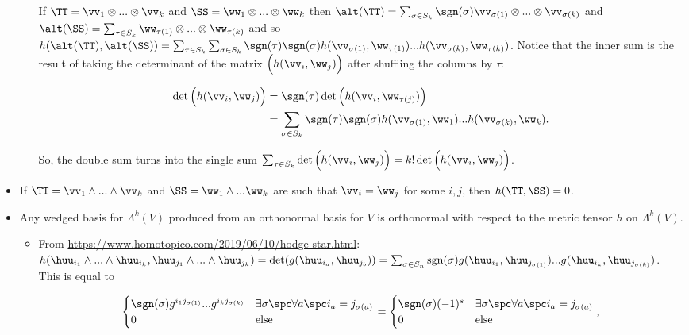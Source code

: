 \begin{itemize}
\begin{itemize}
		If $\TT = \vv_1 \otimes ... \otimes \vv_k$ and $\SS = \ww_1 \otimes ... \otimes \ww_k$ then $\alt(\TT) = \sum_{\sigma \in S_k} \sgn(\sigma) \vv_{\sigma(1)} \otimes ... \otimes \vv_{\sigma(k)}$ and $\alt(\SS) = \sum_{\tau \in S_k} \ww_{\tau(1)} \otimes ... \otimes \ww_{\tau(k)}$ and so $h(\alt(\TT), \alt(\SS)) = \sum_{\tau \in S_k} \sum_{\sigma \in S_k} \sgn(\tau) \sgn(\sigma) h(\vv_{\sigma(1)}, \ww_{\tau(1)}) ... h(\vv_{\sigma(k)}, \ww_{\tau(k)})$. Notice that the inner sum is the result of taking the determinant of the matrix $\Big( h(\vv_i, \ww_j) \Big)$ after shuffling the columns by $\tau$:
		
		\begin{align*}
			\det\Big( h(\vv_i, \ww_j) \Big) &= \sgn(\tau) \det\Big( h(\vv_i, \ww_{\tau(j)}) \Big) \\
			&= \sum_{\sigma \in S_k} \sgn(\tau) \sgn(\sigma) h(\vv_{\sigma(1)}, \ww_1) ... h(\vv_{\sigma(k)}, \ww_k).
		\end{align*}
		
		So, the double sum turns into the single sum $\sum_{\tau \in S_k} \det\Big( h(\vv_i, \ww_j) \Big) = k! \det\Big( h(\vv_i, \ww_j) \Big)$.
	\end{itemize}
	
	\item If $\TT = \vv_1 \wedge ... \wedge \vv_k$ and $\SS = \ww_1 \wedge ... \ww_k$ are such that $\vv_i = \ww_j$ for some $i, j$, then $h(\TT, \SS) = 0$.
	
	\item Any wedged basis for $\Lambda^k(V)$ produced from an orthonormal basis for $V$ is orthonormal with respect to the metric tensor $h$ on $\Lambda^k(V)$.
	\begin{itemize}
		\item From \url{https://www.homotopico.com/2019/06/10/hodge-star.html}: \\ $h(\huu_{i_1} \wedge ... \wedge \huu_{i_k}, \huu_{j_1} \wedge ... \wedge \huu_{j_k}) = \det(g(\huu_{i_a}, \huu_{j_b})) = \sum_{\sigma \in S_n} \text{sgn}(\sigma) g(\huu_{i_1}, \huu_{j_{\sigma(1)}}) ... g(\huu_{i_k}, \huu_{j_{\sigma(k)}})$. This is equal to
		
		\begin{align*}
			\begin{cases}
				\sgn(\sigma) g^{i_1 j_{\sigma(1)}} ... g^{i_k j_{\sigma(k)}} & \exists \sigma \spc \forall a \spc i_a = j_{\sigma(a)} \\
				0 & \text{else}
			\end{cases}
			=
			\begin{cases}
				\sgn(\sigma) (-1)^s & \exists \sigma \spc \forall a \spc i_a = j_{\sigma(a)} \\
				0 & \text{else}
			\end{cases},
		\end{align*}
		

\end{itemize}
\end{itemize}
